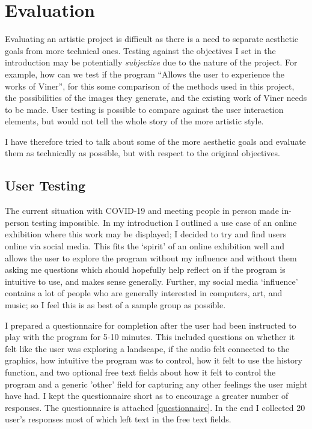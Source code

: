 \chapter{Evaluation}
Evaluating an artistic project is difficult as there is a need to separate
aesthetic goals from more technical ones. Testing against the objectives I set
in the introduction may be potentially \emph{subjective} due to the nature of
the project. For example, how can we test if the program ``Allows the user to
experience the works of Viner'', for this some comparison of the methods used in
this project, the possibilities of the images they generate, and the existing
work of Viner needs to be made. User testing is possible to compare against the
user interaction elements, but would not tell the whole story of the more
artistic style.

I have therefore tried to talk about some of the more aesthetic goals and
evaluate them as technically as possible, but with respect to the original
objectives.

\section{User Testing}
The current situation with COVID-19 and meeting people in person made in-person
testing impossible. In my introduction I outlined a use case of an online exhibition
where this work may be displayed; I decided to try and find users online via
social media. This fits the `spirit' of an online exhibition well and allows the
user to explore the program without my influence and without them asking me
questions which should hopefully help reflect on if the program is intuitive to
use, and makes sense generally. Further, my social media `influence' contains a
lot of people who are generally interested in computers, art, and music; so I
feel this is as best of a sample group as possible.

I prepared a questionnaire for completion after the user had been instructed to
play with the program for 5-10 minutes. This included questions on whether it
felt like the user was exploring a landscape, if the audio felt connected to the
graphics, how intuitive the program was to control, how it felt to use the
history function, and two optional free text fields about how it felt to control
the program and a generic 'other' field for capturing any other feelings the
user might have had. I kept the questionnaire short as to encourage a greater
number of responses. The questionnaire is attached \autoref{questionnaire}. In
the end I collected 20 user's responses most of which left text in the free text
fields.


